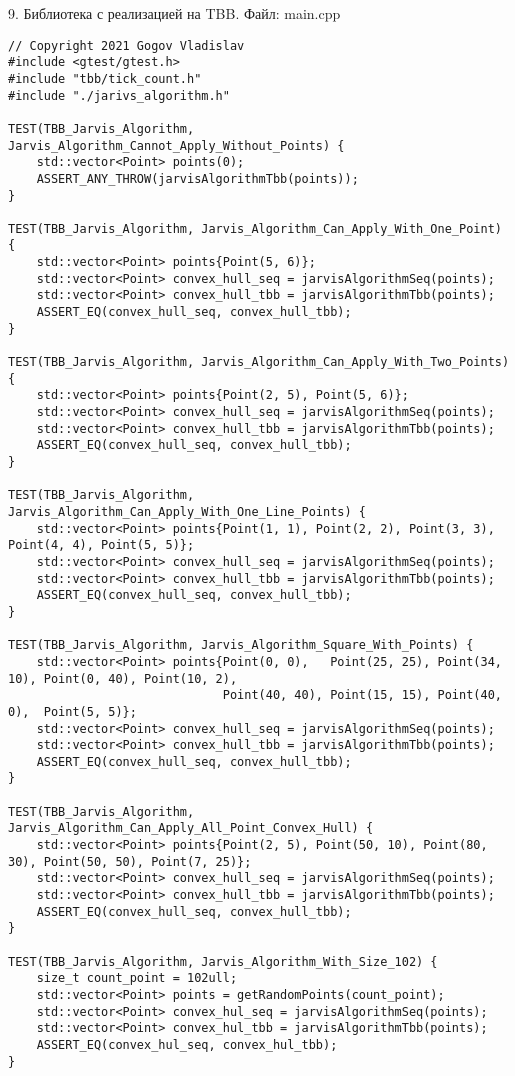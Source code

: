 \documentclass{report}
\begin{document}
\par 9. Библиотека с реализацией на TBB. Файл: main.cpp
\begin{lstlisting}
// Copyright 2021 Gogov Vladislav
#include <gtest/gtest.h>
#include "tbb/tick_count.h"
#include "./jarivs_algorithm.h"

TEST(TBB_Jarvis_Algorithm, Jarvis_Algorithm_Cannot_Apply_Without_Points) {
    std::vector<Point> points(0);
    ASSERT_ANY_THROW(jarvisAlgorithmTbb(points));
}

TEST(TBB_Jarvis_Algorithm, Jarvis_Algorithm_Can_Apply_With_One_Point) {
    std::vector<Point> points{Point(5, 6)};
    std::vector<Point> convex_hull_seq = jarvisAlgorithmSeq(points);
    std::vector<Point> convex_hull_tbb = jarvisAlgorithmTbb(points);
    ASSERT_EQ(convex_hull_seq, convex_hull_tbb);
}

TEST(TBB_Jarvis_Algorithm, Jarvis_Algorithm_Can_Apply_With_Two_Points) {
    std::vector<Point> points{Point(2, 5), Point(5, 6)};
    std::vector<Point> convex_hull_seq = jarvisAlgorithmSeq(points);
    std::vector<Point> convex_hull_tbb = jarvisAlgorithmTbb(points);
    ASSERT_EQ(convex_hull_seq, convex_hull_tbb);
}

TEST(TBB_Jarvis_Algorithm, Jarvis_Algorithm_Can_Apply_With_One_Line_Points) {
    std::vector<Point> points{Point(1, 1), Point(2, 2), Point(3, 3), Point(4, 4), Point(5, 5)};
    std::vector<Point> convex_hull_seq = jarvisAlgorithmSeq(points);
    std::vector<Point> convex_hull_tbb = jarvisAlgorithmTbb(points);
    ASSERT_EQ(convex_hull_seq, convex_hull_tbb);
}

TEST(TBB_Jarvis_Algorithm, Jarvis_Algorithm_Square_With_Points) {
    std::vector<Point> points{Point(0, 0),   Point(25, 25), Point(34, 10), Point(0, 40), Point(10, 2),
                              Point(40, 40), Point(15, 15), Point(40, 0),  Point(5, 5)};
    std::vector<Point> convex_hull_seq = jarvisAlgorithmSeq(points);
    std::vector<Point> convex_hull_tbb = jarvisAlgorithmTbb(points);
    ASSERT_EQ(convex_hull_seq, convex_hull_tbb);
}

TEST(TBB_Jarvis_Algorithm, Jarvis_Algorithm_Can_Apply_All_Point_Convex_Hull) {
    std::vector<Point> points{Point(2, 5), Point(50, 10), Point(80, 30), Point(50, 50), Point(7, 25)};
    std::vector<Point> convex_hull_seq = jarvisAlgorithmSeq(points);
    std::vector<Point> convex_hull_tbb = jarvisAlgorithmTbb(points);
    ASSERT_EQ(convex_hull_seq, convex_hull_tbb);
}

TEST(TBB_Jarvis_Algorithm, Jarvis_Algorithm_With_Size_102) {
    size_t count_point = 102ull;
    std::vector<Point> points = getRandomPoints(count_point);
    std::vector<Point> convex_hul_seq = jarvisAlgorithmSeq(points);
    std::vector<Point> convex_hul_tbb = jarvisAlgorithmTbb(points);
    ASSERT_EQ(convex_hul_seq, convex_hul_tbb);
}


\end{lstlisting}
\end{document}

